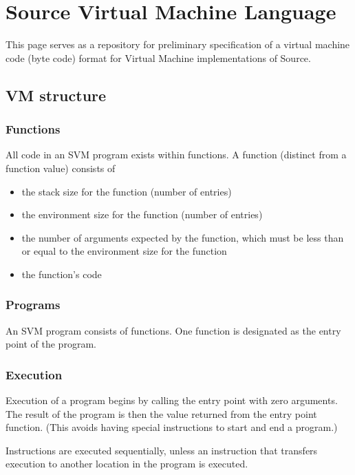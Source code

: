\documentclass[11pt]{article}
\author{koo}
\date{\today}
\title{}
\begin{document}
\tableofcontents

\section{Source Virtual Machine Language}
\label{sec:orgf075a3c}
This page serves as a repository for preliminary specification of a
virtual machine code (byte code) format for Virtual Machine
implementations of Source.

\subsection{VM structure}
\label{sec:org6010758}
\subsubsection{Functions}
\label{sec:org1b043d5}
All code in an SVM program exists within functions. A function (distinct
from a function value) consists of

\begin{itemize}
\item the stack size for the function (number of entries)
\item the environment size for the function (number of entries)
\item the number of arguments expected by the function, which must be less
than or equal to the environment size for the function
\item the function's code
\end{itemize}

\subsubsection{Programs}
\label{sec:org9630e8e}
An SVM program consists of functions. One function is designated as the
entry point of the program.

\subsubsection{Execution}
\label{sec:org3db4c57}
Execution of a program begins by calling the entry point with zero
arguments. The result of the program is then the value returned from the
entry point function. (This avoids having special instructions to start
and end a program.)

Instructions are executed sequentially, unless an instruction that
transfers execution to another location in the program is executed.
\end{document}
